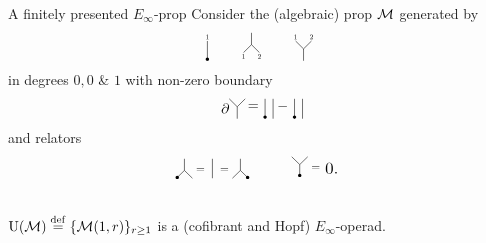 \begin{frame}{A finitely presented $E_\infty$-prop}
	\pause Consider the (algebraic) prop $\mathcal{M}$ generated by
	\[
	\begin{tikzpicture}[scale=.4]
		\draw (0,.5)--(0,-.75);
		\node[scale=.5] at (0,.75){1};
		\fill (0,-.65) circle (3pt);
	\end{tikzpicture}
	\qquad
	\begin{tikzpicture}[scale=.4]
		\draw (0,0)--(0,.75);
		\draw (0,0)--(.5,-.5);
		\draw (0,0)--(-.5,-.5);
		\node[scale=.5] at (-.5,-.75){1};
		\node[scale=.5] at (.5,-.75){2};
	\end{tikzpicture}
	\qquad
	\begin{tikzpicture}[scale=.4]
		\draw (0,0)--(0,-.75);
		\draw (0,0)--(.5,.5);
		\draw (0,0)--(-.5,.5);
		\node[scale=.5] at (-.5,.75){1};
		\node[scale=.5] at (.5,.75){2};
	\end{tikzpicture}
	\vspace*{-2pt}
	\]
	in degrees $0, 0$ \& $1$ with non-zero boundary
	\[
	\begin{tikzpicture}[scale=.4]
		\node[scale=1] at (-.75,-.1){$\partial$};
		\draw (0,0)--(0,-.75);
		\draw (0,0)--(.5,.5);
		\draw (0,0)--(-.5,.5);
		\node[scale=1] at (1,0){$=$};
	\end{tikzpicture}
	\begin{tikzpicture}[scale=.4]
		\draw (0,.5)--(0,-.75);
		\fill (0,-.65) circle (3pt);
		\draw (.5,.5)--(.5,-.75);
		\node[scale=1] at (1.1,0){$-$};
	\end{tikzpicture}
	\begin{tikzpicture}[scale=.4]
		\draw (0,.5)--(0,-.75);
		\fill (0,-.65) circle (3pt);
		\draw (.5,.5)--(.5,-.75);
	\end{tikzpicture}
	\]
	\vskip-5pt
	and relators
	\[
	\begin{tikzpicture}[scale=.4]
		\draw (0,0)--(0,.75);
		\draw (0,0)--(.5,-.5);
		\draw (0,0)--(-.5,-.5);
		\fill (-.45,-.45) circle (3pt);
		\node[scale=.8] at (1,0){$=$};
		\draw (1.75,.75)--(1.75,-.5);
		\node[scale=.8] at (2.5,0){$=$};
		\draw (3.5,0)--(3.5,.75);
		\draw (3.5,0)--(4,-.5);
		\draw (3.5,0)--(3,-.5);
		\fill (3.95,-.45) circle (3pt);
	\end{tikzpicture}
	\quad\qquad
	\begin{tikzpicture}[scale=.4]
		\draw (0,0)--(0,-.75);
		\draw (0,0)--(.5,.5);
		\draw (0,0)--(-.5,.5);
		\fill (0,-.7) circle (3pt);
		\node[scale=.8] at (1,-.25){$=$};
		\node[scale=1.2] at (2,-.25){$0.$};
	\end{tikzpicture}
	\]

	\medskip\pause
	 \\
	$\operatorname{U}(\mathcal{M}) \stackrel{\mathrm{def}}{=} \{\mathcal{M}(1,r)\}_{r \geq 1}$ is a (cofibrant and Hopf) $E_\infty$-operad.
\end{frame}

